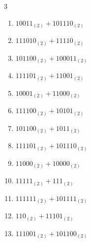 \begin{multicols}{3}
\begin{enumerate}
  \item $10011_{(2)} + 101110_{(2)}$


  \item $111010_{(2)} + 11110_{(2)}$


  \item $101100_{(2)} + 100011_{(2)}$


  \item $111101_{(2)} + 11001_{(2)}$


  \item $10001_{(2)} + 11000_{(2)}$


\columnbreak %

\resetques

  \item $111100_{(2)} + 10101_{(2)}$


  \item $101100_{(2)} + 1011_{(2)}$


  \item $111101_{(2)} + 101110_{(2)}$


  \item $11000_{(2)} + 10000_{(2)}$


  \item $11111_{(2)} + 111_{(2)}$


  \item $111111_{(2)} + 101111_{(2)}$


  \item $110_{(2)} + 11101_{(2)}$


  \item $111001_{(2)} + 101100_{(2)}$



\end{enumerate}
\end{multicols}
